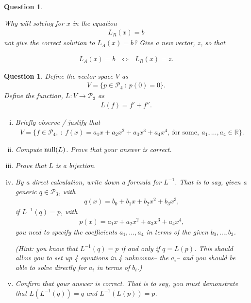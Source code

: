 \documentclass[12pt]{article}
\newtheorem{question}[thm]{Question}
\def\real{{\mathbb R}}
\def\NullLA{\textnormal{null}}
\def\P{\mathcal P}
\begin{document}
\begin{question}
\begin{enumerate}[(i)]
		Why will solving for $x$ in the equation
		\begin{align*}
			L_R(x)=b
		\end{align*}
		not give the correct solution to $L_A(x)=b$?  Give a new vector, $z$, so that
		
		\begin{align*}
			L_A(x)=b\ \ \ \iff\ \ \ L_R(x)=z.
		\end{align*}
	\end{enumerate}
	
	
\end{question}

\vspace{1cm}

\begin{question}\label{que:PrimePlusPrimePrime}
	\normalfont
	Define the vector space $V$ as
	\begin{align*}
		V = \{ p\in\P_4\ :\ p(0)=0 \}.
	\end{align*}
	Define the function, $L:V\to\P_3$ as
	\begin{align*}
		L(f) = f'+f''.
	\end{align*}
	
	\begin{enumerate}[(i)]
		\item Briefly observe / justify that
		\begin{align*}
			V = \{ f\in\P_4,\ :\ f(x) = a_1x + a_2x^2 +a_3x^3 + a_4 x^4,\ \text{for some},\ a_1,\dots,a_4 \in\real\}.
		\end{align*}
		
		\item Compute $\NullLA(L)$.  Prove that your answer is correct. 
		
		\item Prove that $L$ is a bijection.
		
		\item By a direct calculation, write down a formula for $L^{-1}$.  That is to say, given a generic $q\in \P_3$, with 
		\begin{align*}
			q(x)= b_0 + b_1x + b_2x^2 + b_3x^3,
		\end{align*}
		if $L^{-1}(q)=p$, with 
		\begin{align*}
			p(x) = a_1x + a_2x^2 +a_3x^3 + a_4 x^4,
		\end{align*}
		you need to specify the coefficients $a_1,\dots, a_4$ in terms of the given $b_0,\dots, b_3$. 
		
		(Hint: you know that $L^{-1}(q)=p$ if and only if $q=L(p)$.  This should allow you to set up 4 equations in 4 unknowns-- the $a_i$-- and you should be able to solve directly for $a_i$ in terms of $b_i$.)
		
		\item Confirm that your answer is correct.  That is to say, you must demonstrate that $L(L^{-1}(q))=q$ and $L^{-1}(L(p))=p$.
		
	\end{enumerate}
 
 
\end{question}
\end{document}

